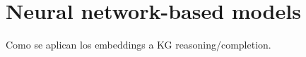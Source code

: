 
\section{Neural network-based models}\label{sec:emb-nn}
Como se aplican los embeddings a KG reasoning/completion. 





